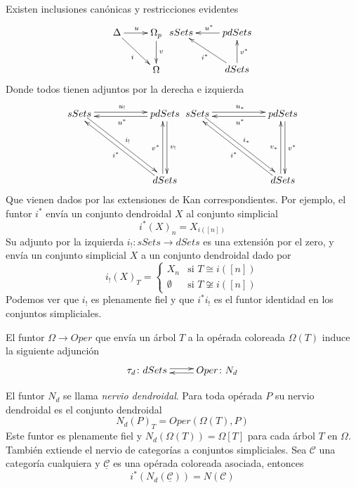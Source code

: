 \documentclass[../main.tex]{subfiles}
\begin{document}
Existen inclusiones can\'onicas y restricciones evidentes
$$
    \xymatrix{
        \Delta \ar[rd]_{i} \ar[r]^u
        &\Omega_p \ar[d]^v\\
        &\Omega
    }
    \xymatrix{
    sSets
    &pdSets \ar[l]_{u^{*}} \\
    &dSets \ar[lu]^{i^{*}} \ar[u]_{v^{*}}
    }
$$
Donde todos tienen adjuntos por la derecha e izquierda
$$
    \xymatrix{
    sSets \ar@<0.5ex>[rr]^{u_{!}} \ar@<0.5ex>[rrdd]^{i_{!}}
    & & pdSets \ar@<0.5ex>[ll]^{u^{*}} \ar@<0.5ex>[dd]^{v_{!}} \\
    & & \\
    & &  dSets \ar@<0.5ex>[lluu]^{i^{*}} \ar@<0.5ex>[uu]^{v^{*}}
    }
    \xymatrix{
    sSets \ar@<0.5ex>[rr]^{u_{*}} \ar@<0.5ex>[rrdd]^{i_{*}}
    & & pdSets \ar@<0.5ex>[ll]^{u^{*}} \ar@<0.5ex>[dd]^{v^{*}} \\
    & & \\
    & & dSets \ar@<0.5ex>[lluu]^{i^{*}} \ar@<0.5ex>[uu]^{v_{*}}
    }
$$
Que vienen dados por las extensiones de Kan correspondientes. Por ejemplo, el funtor $i^{*}$ env\'ia un conjunto dendroidal $X$ al conjunto simplicial
$$
    i^{*}(X)_n = X_{i([n])}
$$
Su adjunto por la izquierda $i_{!}\colon sSets \to dSets$ es una extensi\'on por el zero, y env\'ia un conjunto simplicial $X$ a un conjunto dendroidal dado por
\[
    i_{!}(X)_T =
    \begin{cases}
        X_n       & \text{si } T\cong i([n])     \\
        \emptyset & \text{si } T\not\cong i([n])
    \end{cases}
\]
Podemos ver que $i_!$ es plenamente fiel y que $i^{*}i_{!}$ es el funtor identidad en los conjuntos simpliciales.

El funtor $\Omega \to Oper$ que env\'ia un \'arbol $T$ a la op\'erada coloreada $\Omega(T)$ induce la siguiente adjunci\'on
\[
    \xymatrix{
        \tau_d\colon dSets\ar@<0.5ex>[r] &  Oper\colon N_d \ar@<0.5ex>[l]
    }
\]

El funtor $N_d$ se llama \emph{nervio dendroidal}. Para toda op\'erada $P$ su nervio dendroidal es el conjunto dendroidal
$$
    N_d(P)_T = Oper(\Omega(T), P)
$$
Este funtor es plenamente fiel y $N_d(\Omega(T))=\Omega[T]$ para cada \'arbol $T$ en $\Omega$.
Tambi\'en extiende el nervio de categor\'ias a conjuntos simpliciales. Sea $\mathcal{C}$ una categor\'ia cualquiera y $\underline{\mathcal{C}}$ es una op\'erada coloreada asociada, entonces
$$
    i^{*}(N_d(\underline{\mathcal{C}})) = N(\mathcal{C})
$$
\end{document}
